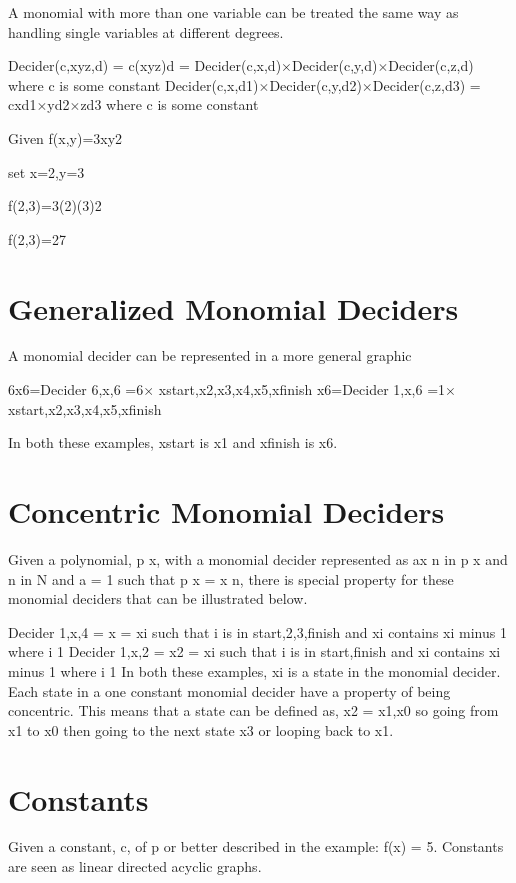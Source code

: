 A monomial with more than one variable can be treated the same way as handling single variables at different degrees.

Decider(c,xyz,d) = c(xyz)d = Decider(c,x,d)$\times $Decider(c,y,d)$\times $Decider(c,z,d) where c is some constant
Decider(c,x,d1)$\times $Decider(c,y,d2)$\times $Decider(c,z,d3) = cxd1$\times $yd2$\times $zd3 where c is some constant

Given f(x,y)=3xy2

set x=2,y=3

f(2,3)=3(2)(3)2

f(2,3)=27

\section{Generalized Monomial Deciders}

A monomial decider can be represented in a more general graphic

6x6=Decider 6,x,6 =6$\times $ xstart,x2,x3,x4,x5,xfinish 
 x6=Decider 1,x,6 =1$\times $ xstart,x2,x3,x4,x5,xfinish 


In both these examples, xstart is x1 and xfinish is x6.


\section{Concentric Monomial Deciders}

Given a polynomial, p x, with a monomial decider represented as ax n in p x and n in N and a = 1 such that p x = x n, there is special property for these monomial deciders that can be illustrated below.

Decider 1,x,4 = x = xi such that i is in start,2,3,finish and xi contains xi minus 1 where i 1
 Decider 1,x,2 = x2 = xi such that i is in start,finish and xi contains xi minus 1 where i 1
 In both these examples, xi is a state in the monomial decider.
Each state in a one constant monomial decider have a property of being concentric. This means that a state can be defined as, x2 =
 x1,x0 so going from x1 to x0 then going to the next state x3 or looping back to x1.
 
\section{Constants}

Given a constant, c, of p or better described in the example: f(x) = 5. Constants are seen as linear directed acyclic graphs.


